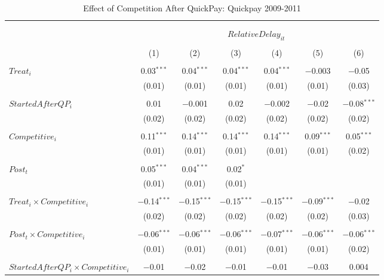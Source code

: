 \documentclass[
]{article}
\begin{document}
\begin{table}[H] \centering 
  \caption{Effect of Competition After QuickPay: Quickpay 2009-2011} 
  \label{} 
\small 
\begin{tabular}{@{\extracolsep{-3pt}}lcccccc} 
\\[-1.8ex]\hline 
\hline \\[-1.8ex] 
\\[-1.8ex] & \multicolumn{6}{c}{$RelativeDelay_{it}$  } \\ 
\\[-1.8ex] & (1) & (2) & (3) & (4) & (5) & (6)\\ 
\hline \\[-1.8ex] 
 $Treat_i$ & 0.03$^{***}$ & 0.04$^{***}$ & 0.04$^{***}$ & 0.04$^{***}$ & $-$0.003 & $-$0.05 \\ 
  & (0.01) & (0.01) & (0.01) & (0.01) & (0.01) & (0.03) \\ 
  & & & & & & \\ 
 $StartedAfterQP_i$ & 0.01 & $-$0.001 & 0.02 & $-$0.002 & $-$0.02 & $-$0.08$^{***}$ \\ 
  & (0.02) & (0.02) & (0.02) & (0.02) & (0.02) & (0.02) \\ 
  & & & & & & \\ 
 $Competitive_i$ & 0.11$^{***}$ & 0.14$^{***}$ & 0.14$^{***}$ & 0.14$^{***}$ & 0.09$^{***}$ & 0.05$^{***}$ \\ 
  & (0.01) & (0.01) & (0.01) & (0.01) & (0.01) & (0.02) \\ 
  & & & & & & \\ 
 $Post_t$ & 0.05$^{***}$ & 0.04$^{***}$ & 0.02$^{*}$ &  &  &  \\ 
  & (0.01) & (0.01) & (0.01) &  &  &  \\ 
  & & & & & & \\ 
 $Treat_i \times Competitive_i$ & $-$0.14$^{***}$ & $-$0.15$^{***}$ & $-$0.15$^{***}$ & $-$0.15$^{***}$ & $-$0.09$^{***}$ & $-$0.02 \\ 
  & (0.02) & (0.02) & (0.02) & (0.02) & (0.02) & (0.03) \\ 
  & & & & & & \\ 
 $Post_t \times Competitive_i$ & $-$0.06$^{***}$ & $-$0.06$^{***}$ & $-$0.06$^{***}$ & $-$0.07$^{***}$ & $-$0.06$^{***}$ & $-$0.06$^{***}$ \\ 
  & (0.01) & (0.01) & (0.01) & (0.01) & (0.01) & (0.02) \\ 
  & & & & & & \\ 
 $StartedAfterQP_i \times Competitive_i$ & $-$0.01 & $-$0.02 & $-$0.01 & $-$0.01 & $-$0.03 & 0.004 \\ 

\end{tabular}
\end{table}
\end{document}
